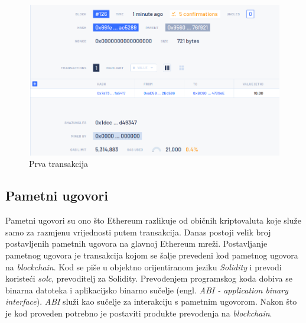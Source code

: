 \documentclass[times, utf8, zavrsni, numeric]{fer}
\begin{document}
\pagebreak

\begin{figure}[ht]
  \includegraphics[width=\textwidth]{blocktx.png}
  \caption{Prva transakcija}
  \centering
  \vfill
\end{figure}

\subsection{Pametni ugovori}
Pametni ugovori su ono što Ethereum razlikuje od običnih kriptovaluta koje služe samo za razmjenu vrijednosti putem transakcija. Danas postoji velik broj postavljenih 
pametnih ugovora na glavnoj Ethereum mreži. Postavljanje pametnog ugovora je transakcija kojom se šalje prevedeni kod pametnog ugovora na \emph{blockchain}.
Kod se piše u objektno orijentiranom jeziku \emph{Solidity} i prevodi koristeći \emph{solc}, prevoditelj za Solidity. Prevođenjem programskog koda dobiva se binarna datoteka
i aplikacijsko binarno sučelje (engl. \emph{ABI - application binary interface}). \emph{ABI} služi kao sučelje za interakciju s pametnim ugovorom. Nakon što je kod
proveden potrebno je postaviti produkte prevođenja na \emph{blockchain}.
\end{document}
